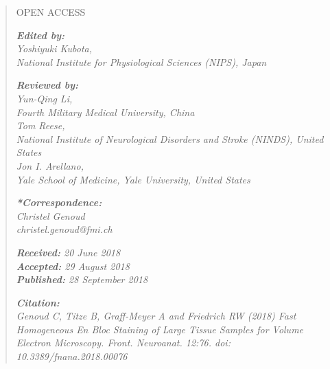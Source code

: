 \documentclass{article}
\begin{document}
\begin{quote}\small
\noindent OPEN ACCESS

\noindent\emph{\textbf{Edited by:}}\\
\emph{Yoshiyuki Kubota,\\ National Institute for Physiological Sciences (NIPS), Japan}

\noindent\emph{\textbf{Reviewed by:}}\\
\emph{Yun-Qing Li,\\ Fourth Military Medical University, China\\ Tom Reese,\\ National Institute of Neurological Disorders and Stroke (NINDS), United States\\ Jon I. Arellano,\\ Yale School of Medicine, Yale University, United States}

\noindent\emph{\textbf{*Correspondence:}}\\
\emph{Christel Genoud\\ christel.genoud@fmi.ch}

\noindent\emph{\textbf{Received:} 20 June 2018}\\
\emph{\textbf{Accepted:} 29 August 2018}\\
\emph{\textbf{Published:} 28 September 2018}

\noindent\emph{\textbf{Citation:}}\\
\emph{Genoud C, Titze B, Graff-Meyer A and Friedrich RW (2018) Fast Homogeneous En Bloc Staining of Large Tissue Samples for Volume Electron Microscopy. Front. Neuroanat. 12:76. doi: 10.3389/fnana.2018.00076}
\end{quote}
\end{document}

